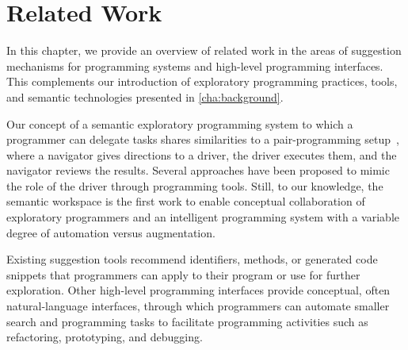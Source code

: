 
\chapter{Related Work}
\label{cha:related_work}

In this chapter, we provide an overview of related work in the areas of suggestion mechanisms for programming systems and high-level programming interfaces.
This complements our introduction of exploratory programming practices, tools, and semantic technologies presented in \cref{cha:background}.

Our concept of a semantic exploratory programming system to which a programmer can delegate tasks shares similarities to a pair-programming setup~\cite{beck2000extreme}, where a navigator gives directions to a driver, the driver executes them, and the navigator reviews the results.
Several approaches have been proposed to mimic the role of the driver through programming tools.
Still, to our knowledge, the semantic workspace is the first work to enable conceptual collaboration of exploratory programmers and an intelligent programming system with a variable degree of automation versus augmentation.


\begin{summary}
	Existing suggestion tools recommend identifiers, methods, or generated code snippets that programmers can apply to their program or use for further exploration.
	Other high-level programming interfaces provide conceptual, often natural-language interfaces, through which programmers can automate smaller search and programming tasks to facilitate programming activities such as refactoring, prototyping, and debugging.
\end{summary}

